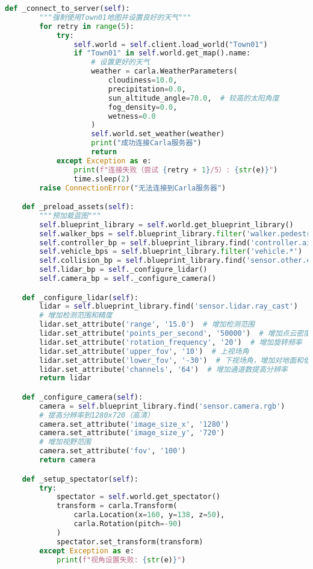 \begin{lstlisting}[language=Python]
    def _connect_to_server(self):
        """强制使用Town01地图并设置良好的天气"""
        for retry in range(5):
            try:
                self.world = self.client.load_world("Town01")
                if "Town01" in self.world.get_map().name:
                    # 设置更好的天气
                    weather = carla.WeatherParameters(
                        cloudiness=10.0,
                        precipitation=0.0,
                        sun_altitude_angle=70.0,  # 较高的太阳角度
                        fog_density=0.0,
                        wetness=0.0
                    )
                    self.world.set_weather(weather)
                    print("成功连接Carla服务器")
                    return
            except Exception as e:
                print(f"连接失败（尝试 {retry + 1}/5）: {str(e)}")
                time.sleep(2)
        raise ConnectionError("无法连接到Carla服务器")

    def _preload_assets(self):
        """预加载蓝图"""
        self.blueprint_library = self.world.get_blueprint_library()
        self.walker_bps = self.blueprint_library.filter('walker.pedestrian.*')
        self.controller_bp = self.blueprint_library.find('controller.ai.walker')
        self.vehicle_bps = self.blueprint_library.filter('vehicle.*')
        self.collision_bp = self.blueprint_library.find('sensor.other.collision')
        self.lidar_bp = self._configure_lidar()
        self.camera_bp = self._configure_camera()

    def _configure_lidar(self):
        lidar = self.blueprint_library.find('sensor.lidar.ray_cast')
        # 增加检测范围和精度
        lidar.set_attribute('range', '15.0')  # 增加检测范围
        lidar.set_attribute('points_per_second', '50000')  # 增加点云密度
        lidar.set_attribute('rotation_frequency', '20')  # 增加旋转频率
        lidar.set_attribute('upper_fov', '10')  # 上视场角
        lidar.set_attribute('lower_fov', '-30')  # 下视场角，增加对地面和低障碍物的检测
        lidar.set_attribute('channels', '64')  # 增加通道数提高分辨率
        return lidar

    def _configure_camera(self):
        camera = self.blueprint_library.find('sensor.camera.rgb')
        # 提高分辨率到1280x720（高清）
        camera.set_attribute('image_size_x', '1280')
        camera.set_attribute('image_size_y', '720')
        # 增加视野范围
        camera.set_attribute('fov', '100')
        return camera

    def _setup_spectator(self):
        try:
            spectator = self.world.get_spectator()
            transform = carla.Transform(
                carla.Location(x=160, y=138, z=50),
                carla.Rotation(pitch=-90)
            )
            spectator.set_transform(transform)
        except Exception as e:
            print(f"视角设置失败: {str(e)}")


\end{lstlisting}
